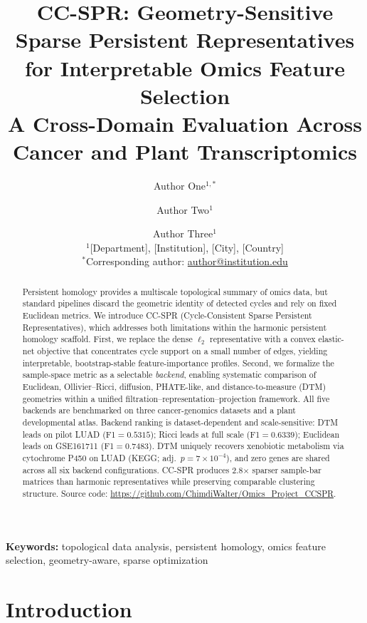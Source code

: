 \documentclass[12pt]{article}
\title{CC-SPR: Geometry-Sensitive Sparse Persistent Representatives\\
for Interpretable Omics Feature Selection\\[6pt]
\large A Cross-Domain Evaluation Across Cancer and Plant Transcriptomics}
\author{
  Author One$^{1,\ast}$ \and
  Author Two$^{1}$ \and
  Author Three$^{1}$\\[6pt]
  \small $^{1}$[Department], [Institution], [City], [Country]\\
  \small $^\ast$Corresponding author: \href{mailto:author@institution.edu}{author@institution.edu}
}
\date{}
\begin{document}
\maketitle

\begin{abstract}
Persistent homology provides a multiscale topological summary of omics data,
but standard pipelines discard the geometric identity of detected cycles and
rely on fixed Euclidean metrics.
We introduce CC-SPR (Cycle-Consistent Sparse Persistent Representatives), which
addresses both limitations within the harmonic persistent homology scaffold.
First, we replace the dense $\ell_2$ representative with a convex elastic-net
objective that concentrates cycle support on a small number of edges, yielding
interpretable, bootstrap-stable feature-importance profiles.
Second, we formalize the sample-space metric as a selectable \emph{backend},
enabling systematic comparison of Euclidean, Ollivier--Ricci, diffusion,
PHATE-like, and distance-to-measure (DTM) geometries within a unified
filtration--representation--projection framework.
All five backends are benchmarked on three cancer-genomics datasets and a
plant developmental atlas.
Backend ranking is dataset-dependent and scale-sensitive: DTM leads on pilot
LUAD (F1${=}0.5315$); Ricci leads at full scale (F1${=}0.6339$); Euclidean leads
on GSE161711 (F1${=}0.7483$).
DTM uniquely recovers xenobiotic metabolism via cytochrome P450 on LUAD
(KEGG; adj.\ $p{=}7{\times}10^{-4}$), and zero genes are shared across all six
backend configurations.
CC-SPR produces 2.8$\times$ sparser sample-bar matrices than harmonic
representatives while preserving comparable clustering structure.
Source code: \url{https://github.com/ChimdiWalter/Omics_Project_CCSPR}.
\end{abstract}

\noindent\textbf{Keywords:} topological data analysis, persistent homology,
omics feature selection, geometry-aware, sparse optimization

\newpage

\section{Introduction}
\label{sec:introduction}
\end{document}
